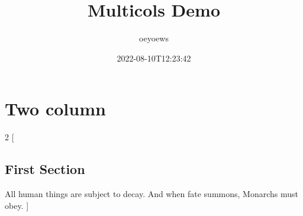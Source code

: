 \documentclass{article}
\title{Multicols Demo}
\author{oeyoews}
\date{2022-08-10T12:23:42}
\begin{document}
\maketitle

\section{ Two column}%
\label{sec: Two column}

\begin{multicols}{2}
	[
		\subsection{First Section}
		All human things are subject to decay. And when fate summons, Monarchs must obey.
	]
	\blindtext\blindtext
\end{multicols}
\end{document}
